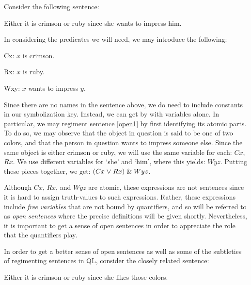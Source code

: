 Consider the following sentence:

\begin{earg}
\item[\ex{open1}] Either it is crimson or ruby since she wants to impress him.
\end{earg}

In considering the predicates we will need, we may introduce the following:

\begin{ekey}
\item[Cx:] $x$ is crimson.
\item[Rx:] $x$ is ruby.
\item[Wxy:] $x$ wants to impress $y$.
\end{ekey}

Since there are no names in the sentence above, we do need to include constants in our symbolization key.
Instead, we can get by with variables alone.
In particular, we may regiment sentence \ref{open1} by first identifying its atomic parts.
To do so, we may observe that the object in question is said to be one of two colors, and that the person in question wants to impress someone else.
Since the same object is either crimson or ruby, we will use the same variable for each: $Cx$, $Rx$.
We use different variables for `she' and `him', where this yields: $Wyz$.
Putting these pieces together, we get: $(Cx \mkern1mu\vee\mkern1mu Rx) \mathrel\& Wyz$.

Although $Cx$, $Rx$, and $Wyz$ are atomic, these expressions are not sentences since it is hard to assign truth-values to such expressions.
Rather, these expressions include \textit{free variables} that are not bound by quantifiers, and so will be referred to as \textit{open sentences} where the precise definitions will be given shortly.
Nevertheless, it is important to get a sense of open sentences in order to appreciate the role that the quantifiers play.

In order to get a better sense of open sentences as well as some of the subtleties of regimenting sentences in QL, consider the closely related sentence:

\begin{earg}
\item[\ex{open2}] Either it is crimson or ruby since she likes those colors.
\end{earg}

